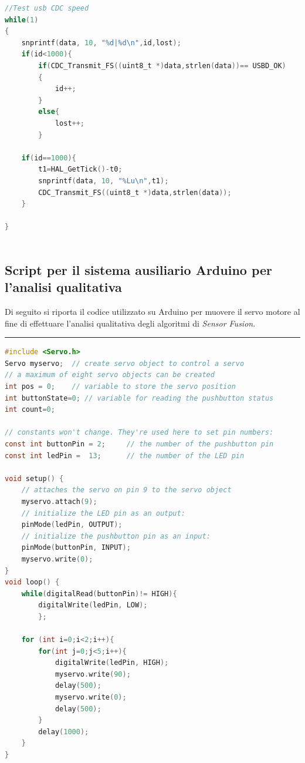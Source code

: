 \begin{lstlisting}[language=C]
 //Test usb CDC speed
while(1)
{
	snprintf(data, 10, "%d|%d\n",id,lost);
	if(id<1000){
		if(CDC_Transmit_FS((uint8_t *)data,strlen(data))== USBD_OK)
		{
			id++;
		}
		else{
			lost++;
		}

	if(id==1000){
		t1=HAL_GetTick()-t0;
		snprintf(data, 10, "%Lu\n",t1);
		CDC_Transmit_FS((uint8_t *)data,strlen(data));
	}
	
}



\end{lstlisting}

\subsection{Script per il sistema ausiliario Arduino per l'analisi qualitativa}
\label{app:scriptArduino}
Di seguito si riporta il codice utilizzato su Arduino per muovere il servo motore al fine di effettuare l'analisi qualitativa degli
algoritmi di \textit{Sensor Fusion}.\\
\noindent\rule{14.1cm}{0.4pt}

\begin{lstlisting}[language=C]
#include <Servo.h>
Servo myservo;  // create servo object to control a servo
// a maximum of eight servo objects can be created
int pos = 0;    // variable to store the servo position
int buttonState=0; // variable for reading the pushbutton status
int count=0;

// constants won't change. They're used here to set pin numbers:
const int buttonPin = 2;     // the number of the pushbutton pin
const int ledPin =  13;      // the number of the LED pin

void setup() {
	// attaches the servo on pin 9 to the servo object
	myservo.attach(9);  
	// initialize the LED pin as an output:
	pinMode(ledPin, OUTPUT);
	// initialize the pushbutton pin as an input:
	pinMode(buttonPin, INPUT);
	myservo.write(0);
}
void loop() {
	while(digitalRead(buttonPin)!= HIGH){
		digitalWrite(ledPin, LOW);
		};
	
	for (int i=0;i<2;i++){
		for(int j=0;j<5;i++){
			digitalWrite(ledPin, HIGH);
			myservo.write(90);
			delay(500);
			myservo.write(0);
			delay(500);
		}
		delay(1000);
	}
}

\end{lstlisting}



